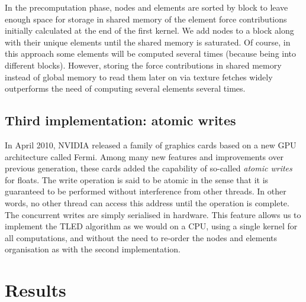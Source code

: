 In the precomputation phase, nodes and elements are sorted by block to leave enough space for storage in shared memory of the element force contributions initially calculated at the end of the first kernel. We add nodes to a block along with their unique elements until the shared memory is saturated. Of course, in this approach some elements will be computed several times (because being into different blocks). However, storing the force contributions in shared memory instead of global memory to read them later on via texture fetches widely outperforms the need of computing several elements several times. 


	\subsection{Third implementation: atomic writes}
In April 2010, NVIDIA released a family of graphics cards based on a new GPU architecture called Fermi. Among many new features and improvements over previous generation, these cards added the capability of so-called \emph{atomic writes} for floats. The write operation is said to be atomic in the sense that it is guaranteed to be performed without interference from other threads. In other words, no other thread can access this address until the operation is complete. The concurrent writes are simply serialised in hardware. This feature allows us to implement the TLED algorithm as we would on a CPU, using a single kernel for all computations, and without the need to re-order the nodes and elements organisation as with the second implementation. 


	
\section{Results}	


